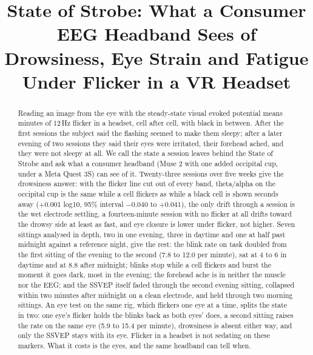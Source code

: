 \documentclass[conference]{IEEEtran}
\begin{document}
\title{State of Strobe: What a Consumer EEG Headband Sees of Drowsiness, Eye Strain and Fatigue Under Flicker in a VR Headset}

\author{
}

\maketitle

\begin{abstract}
Reading an image from the eye with the steady-state visual evoked potential means minutes of 12\,Hz flicker in a headset, cell after cell, with black in between. After the first sessions the subject said the flashing seemed to make them sleepy; after a later evening of two sessions they said their eyes were irritated, their forehead ached, and they were not sleepy at all. We call the state a session leaves behind the State of Strobe and ask what a consumer headband (Muse 2 with one added occipital cup, under a Meta Quest 3S) can see of it. Twenty-three sessions over five weeks give the drowsiness answer: with the flicker line cut out of every band, theta/alpha on the occipital cup is the same while a cell flickers as while a black cell is shown seconds away (+0.001 log10, 95\% interval $-0.040$ to $+0.041$), the only drift through a session is the wet electrode settling, a fourteen-minute session with no flicker at all drifts toward the drowsy side at least as fast, and eye closure is lower under flicker, not higher. Seven sittings analysed in depth, two in one evening, three in daytime and one at half past midnight against a reference night, give the rest: the blink rate on task doubled from the first sitting of the evening to the second (7.8 to 12.0 per minute), sat at 4 to 6 in daytime and at 8.8 after midnight; blinks stop while a cell flickers and burst the moment it goes dark, most in the evening; the forehead ache is in neither the muscle nor the EEG; and the SSVEP itself faded through the second evening sitting, collapsed within two minutes after midnight on a clean electrode, and held through two morning sittings. An eye test on the same rig, which flickers one eye at a time, splits the state in two: one eye's flicker holds the blinks back as both eyes' does, a second sitting raises the rate on the same eye (5.9 to 15.4 per minute), drowsiness is absent either way, and only the SSVEP stays with its eye. Flicker in a headset is not sedating on these markers. What it costs is the eyes, and the same headband can tell when.
\end{abstract}
\end{document}
